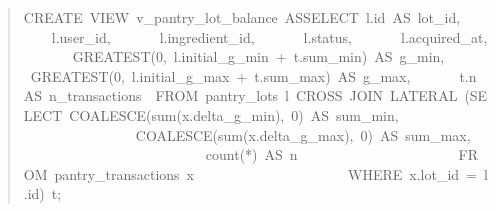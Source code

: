 \begin{quote}\scriptsize\ttfamily\raggedright
CREATE\ VIEW\ v\_\allowbreak{}pantry\_\allowbreak{}lot\_\allowbreak{}balance\ AS\newline{}SELECT\ l.id\ AS\ lot\_\allowbreak{}id,\newline{}\ \ \ \ \ \ \ l.user\_\allowbreak{}id,\newline{}\ \ \ \ \ \ \ l.ingredient\_\allowbreak{}id,\newline{}\ \ \ \ \ \ \ l.status,\newline{}\ \ \ \ \ \ \ l.acquired\_\allowbreak{}at,\newline{}\ \ \ \ \ \ \ GREATEST(0,\ l.initial\_\allowbreak{}g\_\allowbreak{}min\ +\ t.sum\_\allowbreak{}min)\ AS\ g\_\allowbreak{}min,\newline{}\ \ \ \ \ \ \ GREATEST(0,\ l.initial\_\allowbreak{}g\_\allowbreak{}max\ +\ t.sum\_\allowbreak{}max)\ AS\ g\_\allowbreak{}max,\newline{}\ \ \ \ \ \ \ t.n\ AS\ n\_\allowbreak{}transactions\newline{}\ \ FROM\ pantry\_\allowbreak{}lots\ l\newline{}\ CROSS\ JOIN\ LATERAL\ (SELECT\ COALESCE(sum(x.delta\_\allowbreak{}g\_\allowbreak{}min),\ 0)\ AS\ sum\_\allowbreak{}min,\newline{}\ \ \ \ \ \ \ \ \ \ \ \ \ \ \ \ \ \ \ \ \ \ \ \ \ \ \ \ COALESCE(sum(x.delta\_\allowbreak{}g\_\allowbreak{}max),\ 0)\ AS\ sum\_\allowbreak{}max,\newline{}\ \ \ \ \ \ \ \ \ \ \ \ \ \ \ \ \ \ \ \ \ \ \ \ \ \ \ \ count(*)\ AS\ n\newline{}\ \ \ \ \ \ \ \ \ \ \ \ \ \ \ \ \ \ \ \ \ \ \ FROM\ pantry\_\allowbreak{}transactions\ x\newline{}\ \ \ \ \ \ \ \ \ \ \ \ \ \ \ \ \ \ \ \ \ \ WHERE\ x.lot\_\allowbreak{}id\ =\ l.id)\ t;
\end{quote}
